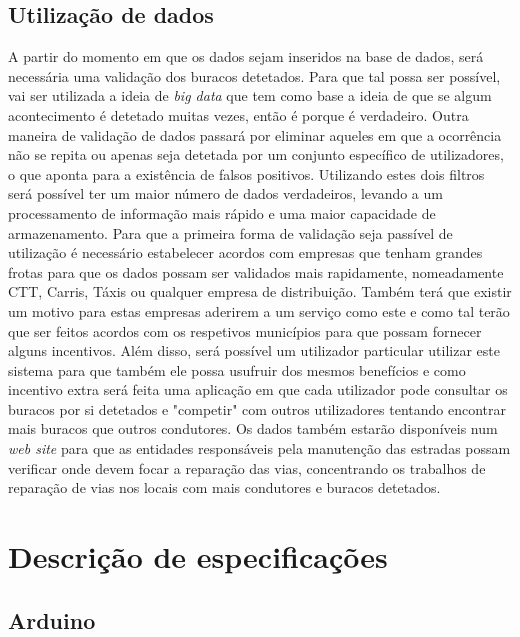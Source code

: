 \subsection{Utilização de dados}
\label{subsec: utilizacao_de_dados}

A partir do momento em que os dados sejam inseridos na base de dados, será necessária uma validação dos buracos detetados. Para que tal possa ser possível, vai ser utilizada a ideia de \emph{big data} que tem como base a ideia de que se algum acontecimento é detetado muitas vezes, então é porque é verdadeiro. Outra maneira de validação de dados passará por eliminar aqueles em que a ocorrência não se repita ou apenas seja detetada por um conjunto específico de utilizadores, o que aponta para a existência de falsos positivos. Utilizando estes dois filtros será possível ter um maior número de dados verdadeiros, levando a um processamento de informação mais rápido e uma maior capacidade de armazenamento. Para que a primeira forma de validação seja passível de utilização é necessário estabelecer acordos com empresas que tenham grandes frotas para que os dados possam ser validados mais rapidamente, nomeadamente CTT, Carris, Táxis ou qualquer empresa de distribuição. Também terá que existir um motivo para estas empresas aderirem a um serviço como este  e como tal terão que ser feitos acordos com os respetivos municípios para que possam fornecer alguns incentivos. Além disso, será possível um utilizador particular utilizar este sistema para que também ele possa usufruir dos mesmos benefícios e como incentivo extra será feita uma aplicação em que cada utilizador pode consultar os buracos por si detetados e "competir" com outros utilizadores tentando encontrar mais buracos que outros condutores. Os dados também estarão disponíveis num \emph{web site} para que as entidades responsáveis pela manutenção das estradas possam verificar onde devem focar a reparação das vias, concentrando os trabalhos de reparação de vias nos locais com mais condutores e buracos detetados.

\section{Descrição de especificações}
\label{sec:descrição_de_especificações}

\subsection{Arduino}
\label{sub: arduino}

